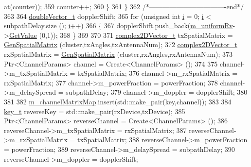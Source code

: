 \begin{DoxyCode}
      at(counter));
359                                 counter++;
360                         \}
361                 \}
362                 \textcolor{comment}{/*----------------------------------end*/}
363 
364                 \hyperlink{namespacens3_aa6f1edf6566ca6afec613bc6e40240ea}{doubleVector\_t} dopplerShift;
365                 \textcolor{keywordflow}{for} (\textcolor{keywordtype}{unsigned} \textcolor{keywordtype}{int} \hyperlink{bernuolliDistribution_8m_a6f6ccfcf58b31cb6412107d9d5281426}{i} = 0; \hyperlink{bernuolliDistribution_8m_a6f6ccfcf58b31cb6412107d9d5281426}{i} < subpathDelay.size (); \hyperlink{bernuolliDistribution_8m_a6f6ccfcf58b31cb6412107d9d5281426}{i}++)
366                 \{
367                         dopplerShift.push\_back(\hyperlink{classns3_1_1MmWaveChannelMatrix_a914afe40a958ddccd64a99f86190be0c}{m\_uniformRv}->\hyperlink{classns3_1_1UniformRandomVariable_a03822d8c86ac51e9aa83bbc73041386b}{GetValue} (0,1));
368                 \}
369 
370 
371                 \hyperlink{namespacens3_aa25e3feece2676fd7470d50d4ba3d1d1}{complex2DVector\_t} txSpatialMatrix = 
      \hyperlink{classns3_1_1MmWaveChannelMatrix_a1395b9e11d00ccf0188e0b464a4b0fdb}{GenSpatialMatrix} (cluster,txAngles,txAntennaNum);
372                 \hyperlink{namespacens3_aa25e3feece2676fd7470d50d4ba3d1d1}{complex2DVector\_t} rxSpatialMatrix = 
      \hyperlink{classns3_1_1MmWaveChannelMatrix_a1395b9e11d00ccf0188e0b464a4b0fdb}{GenSpatialMatrix} (cluster,rxAngles,rxAntennaNum);
373                 Ptr<ChannelParams> channel = Create<ChannelParams> ();
374 
375                 channel->m\_txSpatialMatrix = txSpatialMatrix;
376                 channel->m\_rxSpatialMatrix = rxSpatialMatrix;
377                 channel->m\_powerFraction = powerFraction;
378                 channel->m\_delaySpread = subpathDelay;
379                 channel->m\_doppler = dopplerShift;
380 
381 
382                 \hyperlink{classns3_1_1MmWaveChannelMatrix_ad505ccb88c10f493fbba01d12732241f}{m\_channelMatrixMap}.insert(std::make\_pair(key,channel));
383 
384                 \hyperlink{namespacens3_aa42bd408e172586b3b192acfaa36b070}{key\_t} reverseKey = std::make\_pair(rxDevice,txDevice);
385                 Ptr<ChannelParams> reverseChannel = Create<ChannelParams> ();
386                 reverseChannel->m\_txSpatialMatrix = rxSpatialMatrix;
387                 reverseChannel->m\_rxSpatialMatrix = txSpatialMatrix;
388                 reverseChannel->m\_powerFraction = powerFraction;
389                 reverseChannel->m\_delaySpread = subpathDelay;
390                 reverseChannel->m\_doppler = dopplerShift;

\end{DoxyCode}
